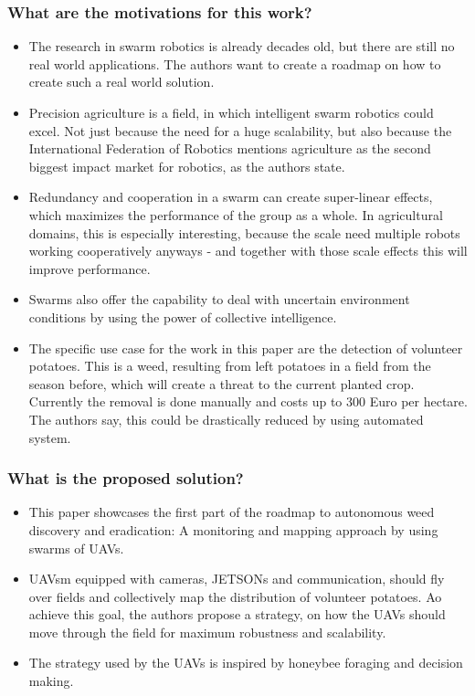 \subsubsection*{What are the motivations for this work?}
\begin{itemize}
    \item The research in swarm robotics is already decades old, but there are still no real world applications. The authors want to create a roadmap on how to create such a real world solution.
    \item Precision agriculture is a field, in which intelligent swarm robotics could excel. Not just because the need for a huge scalability, but also because the International Federation of Robotics mentions agriculture as the second biggest impact market for robotics, as the authors state.
    \item Redundancy and cooperation in a swarm can create super-linear effects, which maximizes the performance of the group as a whole. In agricultural domains, this is especially interesting, because the scale need multiple robots working cooperatively anyways - and together with those scale effects this will improve performance.
    \item Swarms also offer the capability to deal with uncertain environment conditions by using the power of collective intelligence.
    \item The specific use case for the work in this paper are the detection of volunteer potatoes. This is a weed, resulting from left potatoes in a field from the season before, which will create a threat to the current planted crop. Currently the removal is done manually and costs up to 300 Euro per hectare. The authors say, this could be drastically reduced by using automated system.
\end{itemize}
\subsubsection*{What is the proposed solution?}
\begin{itemize}
    \item This paper showcases the first part of the roadmap to autonomous weed discovery and eradication: A monitoring and mapping approach by using swarms of UAVs.
    \item UAVsm equipped with cameras, JETSONs and communication, should fly over fields and collectively map the distribution of volunteer potatoes. Ao achieve this goal, the authors propose a strategy, on how the UAVs should move through the field for maximum robustness and scalability.
    \item The strategy used by the UAVs is inspired by honeybee foraging and decision making. 
\end{itemize}
